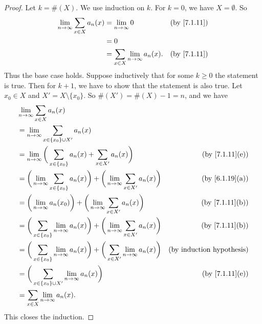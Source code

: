 \begin{proof}
  Let \(k = \#(X)\).
  We use induction on \(k\).
  For \(k = 0\), we have \(X = \emptyset\).
  So
  \begin{align*}
    \lim_{n \to \infty} \sum_{x \in X} a_n(x) & = \lim_{n \to \infty} 0                      & \text{(by \cref{7.1.11})} \\
                                              & = 0                                                                      \\
                                              & = \sum_{x \in X} \lim_{n \to \infty} a_n(x). & \text{(by \cref{7.1.11})}
  \end{align*}
  Thus the base case holds.
  Suppose inductively that for some \(k \geq 0\) the statement is true.
  Then for \(k + 1\), we have to show that the statement is also true.
  Let \(x_0 \in X\) and \(X' = X \setminus \{x_0\}\).
  So \(\#(X') = \#(X) - 1 = n\), and we have
  \begin{align*}
     & \lim_{n \to \infty} \sum_{x \in X} a_n(x)                                                                                                                 \\
     & = \lim_{n \to \infty} \sum_{x \in \{x_0\} \cup X'} a_n(x)                                                                                                 \\
     & = \lim_{n \to \infty} \bigg(\sum_{x \in \{x_0\}} a_n(x) + \sum_{x \in X'} a_n(x)\bigg)                                 & \text{(by \cref{7.1.11}(e))}     \\
     & = \bigg(\lim_{n \to \infty} \sum_{x \in \{x_0\}} a_n(x)\bigg) + \bigg(\lim_{n \to \infty} \sum_{x \in X'} a_n(x)\bigg) & \text{(by \cref{6.1.19}(a))}     \\
     & = \bigg(\lim_{n \to \infty} a_n(x_0)\bigg) + \bigg(\lim_{n \to \infty} \sum_{x \in X'} a_n(x)\bigg)                    & \text{(by \cref{7.1.11}(b))}     \\
     & = \bigg(\sum_{x \in \{x_0\}} \lim_{n \to \infty} a_n(x)\bigg) + \bigg(\lim_{n \to \infty} \sum_{x \in X'} a_n(x)\bigg) & \text{(by \cref{7.1.11}(b))}     \\
     & = \bigg(\sum_{x \in \{x_0\}} \lim_{n \to \infty} a_n(x)\bigg) + \bigg(\sum_{x \in X'} \lim_{n \to \infty} a_n(x)\bigg) & \text{(by induction hypothesis)} \\
     & = \bigg(\sum_{x \in \{x_0\} \cup X'} \lim_{n \to \infty} a_n(x)\bigg)                                                  & \text{(by \cref{7.1.11}(e))}     \\
     & = \sum_{x \in X} \lim_{n \to \infty} a_n(x).
  \end{align*}
  This closes the induction.
\end{proof}